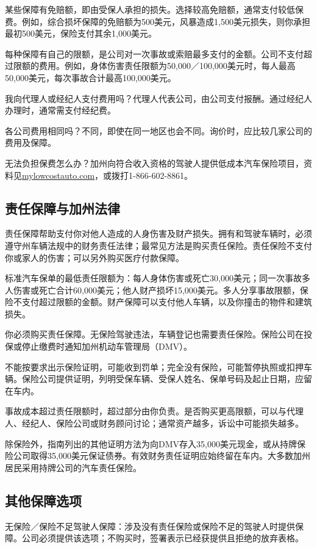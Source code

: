\documentclass[UTF8,fontset=none,11pt,a4paper]{ctexart}
\begin{document}
某些保障有免赔额，即由受保人承担的损失。选择较高免赔额，通常支付较低保费。例如，综合损坏保障的免赔额为500美元，风暴造成1,500美元损失，则你承担最初500美元，保险支付其余1,000美元。


每种保障有自己的限额，是公司对一次事故或索赔最多支付的金额。公司不支付超过限额的费用。例如，身体伤害责任限额为50,000／100,000美元时，每人最高50,000美元，每次事故合计最高100,000美元。


我向代理人或经纪人支付费用吗？代理人代表公司，由公司支付报酬。通过经纪人办理时，通常需支付经纪费。


各公司费用相同吗？不同，即使在同一地区也会不同。询价时，应比较几家公司的费用及保障。


无法负担保费怎么办？加州向符合收入资格的驾驶人提供低成本汽车保险项目，资料见\url{mylowcostauto.com}，或拨打1-866-602-8861。


\subsection*{责任保障与加州法律}
责任保障帮助支付你对他人造成的人身伤害及财产损失。拥有和驾驶车辆时，必须遵守州车辆法规中的财务责任法律；最常见方法是购买责任保险。责任保险不支付你或家人的伤害；可以另外购买医疗付款保障。


标准汽车保单的最低责任限额为：每人身体伤害或死亡30,000美元；同一次事故多人伤害或死亡合计60,000美元；他人财产损坏15,000美元。多人分享事故限额，保险不支付超过限额的金额。财产保障可以支付他人车辆，以及你撞击的物件和建筑损失。


你必须购买责任保障。无保险驾驶违法，车辆登记也需要责任保险。保险公司在投保或停止缴费时通知加州机动车管理局（DMV）。


不能按要求出示保险证明，可能收到罚单；完全没有保险，可能暂停执照或扣押车辆。保险公司提供证明，列明受保车辆、受保人姓名、保单号码及起止日期，应留在车内。


事故成本超过责任限额时，超过部分由你负责。是否购买更高限额，可以与代理人、经纪人、保险公司或财务顾问讨论；通常资产越多，诉讼中可能损失越多。


除保险外，指南列出的其他证明方法为向DMV存入35,000美元现金，或从持牌保险公司取得35,000美元保证债券。有效财务责任证明应始终留在车内。大多数加州居民采用持牌公司的汽车责任保险。


\subsection*{其他保障选项}
无保险／保险不足驾驶人保障：涉及没有责任保险或保险不足的驾驶人时提供保障。公司必须提供该选项；不购买时，签署表示已经获提供且拒绝的放弃表格。
\end{document}
